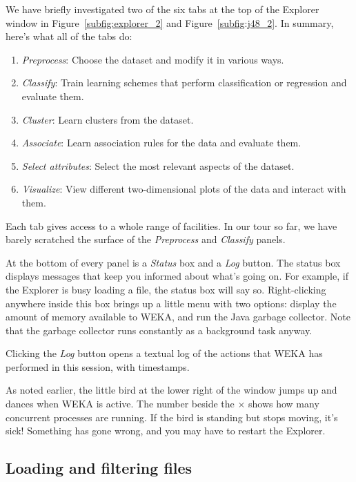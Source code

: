We have briefly investigated two of the six tabs at the top of the
Explorer window in Figure~\ref{subfig:explorer_2} and
Figure~\ref{subfig:j48_2}. In summary, here's what all of the tabs do:

\begin{enumerate}
\item \textit{Preprocess}: Choose the dataset and modify it in various ways.
\item \textit{Classify}: Train learning schemes that perform classification or regression and evaluate them.
\item \textit{Cluster}: Learn clusters from the dataset.
\item \textit{Associate}: Learn association rules for the data and evaluate them.
\item \textit{Select attributes}: Select the most relevant aspects of the dataset.
\item \textit{Visualize}: View different two-dimensional plots of the data and interact with them.
\end{enumerate}

Each tab gives access to a whole range of facilities. In our tour so
far, we have barely scratched the surface of the \textit{Preprocess}
and \textit{Classify} panels.

At the bottom of every panel is a \textit{Status} box and a
\textit{Log} button. The status box displays messages that keep you
informed about what's going on. For example, if the Explorer is busy
loading a file, the status box will say so. Right-clicking anywhere
inside this box brings up a little menu with two options: display the
amount of memory available to WEKA, and run the Java garbage
collector. Note that the garbage collector runs constantly as a
background task anyway.

Clicking the \textit{Log} button opens a textual log of the actions that WEKA
has performed in this session, with timestamps.

As noted earlier, the little bird at the lower right of the window
jumps up and dances when WEKA is active. The number beside the $\times$
shows how many concurrent processes are running. If the bird is
standing but stops moving, it's sick! Something has gone wrong, and
you may have to restart the Explorer.

\subsection{Loading and filtering files}

